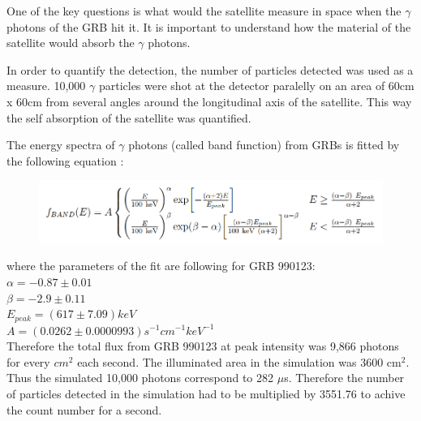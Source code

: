 \documentclass[12pt, a4paper,titlepage]{article}
\numberwithin{equation}{section}
\numberwithin{figure}{section}
\begin{document}
One of the key questions is what would the satellite measure in space when the $\gamma$ photons of the GRB hit it. It is important to understand how the material of the satellite would absorb the $\gamma$ photons. 

In order to quantify the detection, the number of particles detected was used as a measure. 10,000 $\gamma$ particles were shot at the detector paralelly on an area of 60cm x 60cm from several angles around the longitudinal axis of the satellite. This way the self absorption of the satellite was quantified.

The energy spectra of $\gamma$ photons (called band function) from GRBs is fitted by the following equation \cite{band_func}:

\begin{figure}[h!]
\begin{center}
\includegraphics[width=130.0mm]{images/band_function.png}
\label{eq:bandfunc}
\end{center}
\end{figure}

where the parameters of the fit are following for GRB 990123:\\
$\alpha = -0.87 \pm 0.01 $\\
$\beta = -2.9 \pm 0.11$\\
$E_{peak} = (617 \pm 7.09) keV$\\
$A= (0.0262 \pm 0.0000993) s^{-1}cm^{-1}keV^{-1}$\\

Therefore the total flux from GRB 990123 at peak intensity was 9,866 photons for every $cm^{2}$ each second. The illuminated area in the simulation was 3600 cm$^{2}$. Thus the simulated 10,000 photons correspond to 282 $\mu$s. Therefore the number of particles detected in the simulation had to be multiplied by 3551.76 to achive the count number for a second.
\end{document}
